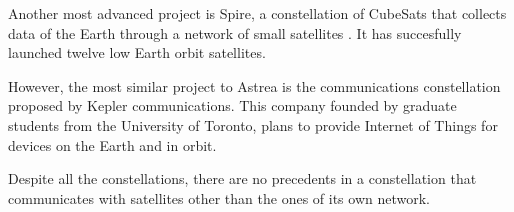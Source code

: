 Another most advanced project is Spire, a constellation of CubeSats that collects data of the Earth through a network of small satellites \cite{spire}. It has succesfully launched twelve low Earth orbit satellites.

However, the most similar project to Astrea is the communications constellation proposed by Kepler communications. This company founded by graduate students from the University of Toronto, plans to provide Internet of Things for devices on the Earth and in orbit.

Despite all the constellations, there are no precedents in a constellation that communicates with satellites other than the ones of its own network.